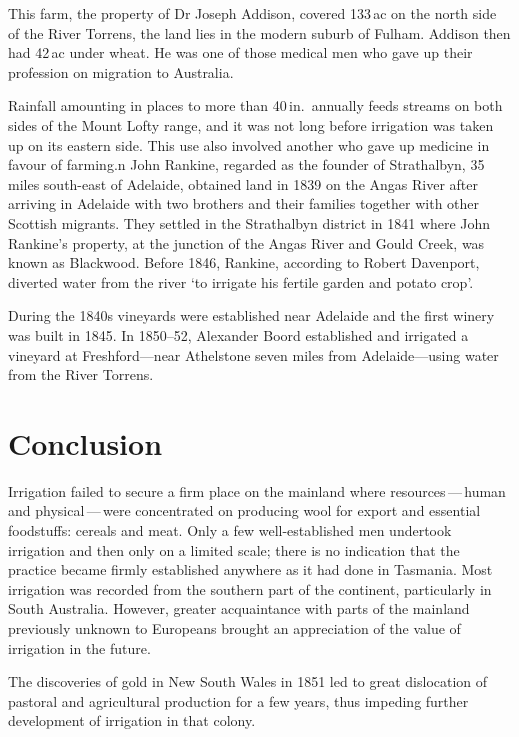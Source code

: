 This farm, the property of Dr Joseph Addison, covered 133\,ac on the
north side of the River Torrens, the land lies in the modern suburb of
Fulham.  Addison then had 42\,ac under wheat. He was one of those
medical men who gave up their profession on migration to
Australia.

Rainfall amounting in places to more than 40\,in.\ annually feeds
streams on both sides of the Mount Lofty range, and it was not long
before irrigation was taken up on its eastern side.  This use also
involved another who gave up medicine in favour of farming.n John
Rankine, regarded as the founder of Strathalbyn, 35 miles south-east
of Adelaide, obtained land in 1839 on the Angas River after arriving
in Adelaide with two brothers and their families together with other
Scottish migrants.  They settled in the Strathalbyn district in 1841
where John Rankine's property, at the junction of the Angas River and
Gould Creek, was known as Blackwood.  Before 1846, Rankine, according
to Robert Davenport, diverted water from the river `to irrigate his
fertile garden and potato crop'.

During the 1840s vineyards were established near Adelaide and the
first winery was built in 1845.  In 1850--52, Alexander Boord
established and irrigated a vineyard at Freshford---near Athelstone
seven miles from Adelaide---using water from the River
Torrens.

\section*{Conclusion}

Irrigation failed to secure a firm place on the mainland where
resources\,---\,human and physical\,---\,were concentrated on
producing wool for export and essential foodstuffs: cereals and meat.
Only a few well-established men undertook irrigation and then only on
a limited scale; there is no indication that the practice became
firmly established anywhere as it had done in Tasmania.  Most
irrigation was recorded from the southern part of the continent,
particularly in South Australia.  However, greater acquaintance with
parts of the mainland previously unknown to Europeans brought an
appreciation of the value of irrigation in the future.

The discoveries of gold in New South Wales in 1851 led to great
dislocation of pastoral and agricultural production for a few years,
thus impeding further development of irrigation in that colony.

